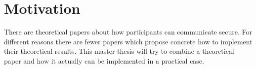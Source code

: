 \section{Motivation}
There are theoretical papers about how participants can communicate secure. For different reasons there are fewer papers which propose concrete how to implement their theoretical results. This master thesis will try to combine a theoretical paper and how it actually can be implemented in a practical case. 